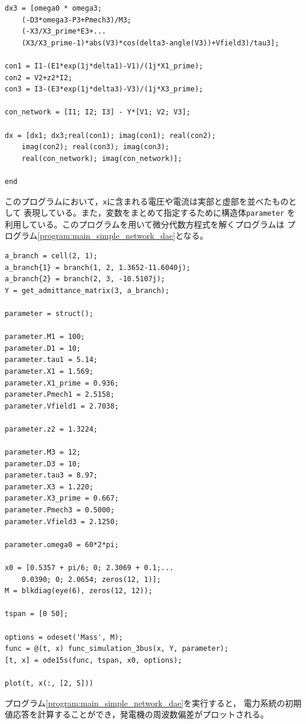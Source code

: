 \documentclass[tombow,dvipdfmx]{corona-a5-1.1}
\begin{document}
\begin{例}[電力系統のシミュレーションのシンプルな実装]
\begin{PROGRAMA}[count,title={func\_simulation\_3bus.m}]
\begin{verbatim}
dx3 = [omega0 * omega3;
    (-D3*omega3-P3+Pmech3)/M3;
    (-X3/X3_prime*E3+...
    (X3/X3_prime-1)*abs(V3)*cos(delta3-angle(V3))+Vfield3)/tau3];

con1 = I1-(E1*exp(1j*delta1)-V1)/(1j*X1_prime);
con2 = V2+z2*I2;
con3 = I3-(E3*exp(1j*delta3)-V3)/(1j*X3_prime);

con_network = [I1; I2; I3] - Y*[V1; V2; V3];

dx = [dx1; dx3;real(con1); imag(con1); real(con2);
    imag(con2); real(con3); imag(con3);
    real(con_network); imag(con_network)];

end
\end{verbatim}
\end{PROGRAMA}

このプログラムにおいて，\verb|x|に含まれる電圧や電流は実部と虚部を並べたものとして
表現している。また，変数をまとめて指定するために構造体\verb|parameter|
を利用している。このプログラムを用いて微分代数方程式を解くプログラムは
プログラム\nobreak\ref{program:main_simple_network_dae}となる。
\begin{PROGRAMA}[count,title={main\_simulation\_simple.m}]\label{program:main_simple_network_dae}
\begin{verbatim}
a_branch = cell(2, 1);
a_branch{1} = branch(1, 2, 1.3652-11.6040j);
a_branch{2} = branch(2, 3, -10.5107j);
Y = get_admittance_matrix(3, a_branch);

parameter = struct();

parameter.M1 = 100;
parameter.D1 = 10;
parameter.tau1 = 5.14;
parameter.X1 = 1.569;
parameter.X1_prime = 0.936;
parameter.Pmech1 = 2.5158;
parameter.Vfield1 = 2.7038;

parameter.z2 = 1.3224;

parameter.M3 = 12;
parameter.D3 = 10;
parameter.tau3 = 8.97;
parameter.X3 = 1.220;
parameter.X3_prime = 0.667;
parameter.Pmech3 = 0.5000;
parameter.Vfield3 = 2.1250;

parameter.omega0 = 60*2*pi;

x0 = [0.5357 + pi/6; 0; 2.3069 + 0.1;...
    0.0390; 0; 2.0654; zeros(12, 1)];
M = blkdiag(eye(6), zeros(12, 12));

tspan = [0 50];

options = odeset('Mass', M);
func = @(t, x) func_simulation_3bus(x, Y, parameter);
[t, x] = ode15s(func, tspan, x0, options); 

plot(t, x(:, [2, 5]))
\end{verbatim}
\end{PROGRAMA}
プログラム\nobreak\ref{program:main_simple_network_dae}を実行すると，
電力系統の初期値応答を計算することができ，発電機の周波数偏差がプロットされる。
\end{例}
\end{document}
